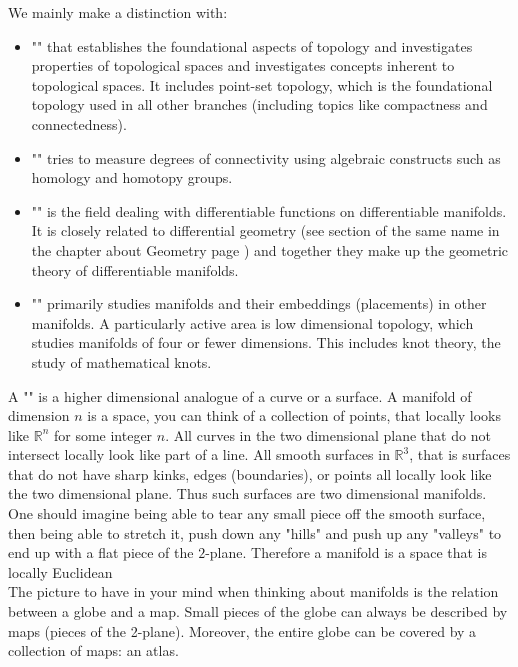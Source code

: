 We mainly make a distinction with:
	\begin{itemize}
		\item "" that establishes the foundational aspects of topology and investigates properties of topological spaces and investigates concepts inherent to topological spaces. It includes point-set topology, which is the foundational topology used in all other branches (including topics like compactness and connectedness).
		
		\item "" tries to measure degrees of connectivity using algebraic constructs such as homology and homotopy groups.
		\item "" is the field dealing with differentiable functions on differentiable manifolds. It is closely related to differential geometry (see section of the same name in the chapter about Geometry page \pageref{differential geometry}) and together they make up the geometric theory of differentiable manifolds.
		\item "" primarily studies manifolds and their embeddings (placements) in other manifolds. A particularly active area is low dimensional topology, which studies manifolds of four or fewer dimensions. This includes knot theory, the study of mathematical knots.	
	\end{itemize}
	\begin{tcolorbox}[title=Remark,arc=10pt,breakable,drop lifted shadow,
  skin=enhanced,
  skin first is subskin of={enhancedfirst}{arc=10pt,no shadow},
  skin middle is subskin of={enhancedmiddle}{arc=10pt,no shadow},
  skin last is subskin of={enhancedlast}{drop lifted shadow}]
	A "" is a higher dimensional analogue of a curve or a surface. A manifold of dimension $n$ is a space, you can think of a collection of points, that locally looks like $\mathbb{R}^{n}$ for some integer $n$. All curves in the two dimensional plane that do not intersect locally look like part of a line. All smooth surfaces in $\mathbb{R}^3$, that is surfaces that do not have sharp kinks, edges (boundaries), or points all locally look like the two dimensional plane. Thus such surfaces are two dimensional manifolds. One should imagine being able to tear any small piece off the smooth surface, then being able to stretch it, push down any "hills" and push up any "valleys" to end up with a flat piece of the $2$-plane. Therefore a manifold is a space that is locally Euclidean\\
	
	The picture to have in your mind when thinking about manifolds is the relation between a globe and a map. Small pieces of the globe can always be described by maps (pieces of the 2-plane). Moreover, the entire globe can be covered by a collection of maps: an atlas.
	\end{tcolorbox}
